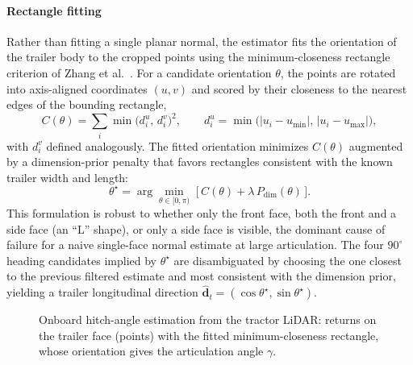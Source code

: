 \paragraph{Rectangle fitting} Rather than fitting a single planar normal, the estimator fits the orientation of the trailer body to the cropped points using the minimum-closeness rectangle criterion of Zhang et al.~\cite{zhang2017lshape}. For a candidate orientation $\theta$, the points are rotated into axis-aligned coordinates $(u, v)$ and scored by their closeness to the nearest edges of the bounding rectangle,
\begin{equation}
    C(\theta) = \sum_i \min\!\big(d^u_i,\, d^v_i\big)^2,
    \qquad
    d^u_i = \min\!\big(|u_i - u_\text{min}|,\, |u_i - u_\text{max}|\big),
    \label{eq:hitch_closeness}
\end{equation}
with $d^v_i$ defined analogously. The fitted orientation minimizes $C(\theta)$ augmented by a dimension-prior penalty that favors rectangles consistent with the known trailer width and length:
\begin{equation}
    \theta^\star = \arg\min_{\theta \in [0, \pi)} \;\big[\, C(\theta) + \lambda\, P_\text{dim}(\theta) \,\big].
    \label{eq:hitch_fit}
\end{equation}
This formulation is robust to whether only the front face, both the front and a side face (an ``L'' shape), or only a side face is visible, the dominant cause of failure for a naive single-face normal estimate at large articulation. The four $90^\circ$ heading candidates implied by $\theta^\star$ are disambiguated by choosing the one closest to the previous filtered estimate and most consistent with the dimension prior, yielding a trailer longitudinal direction $\hat{\mathbf{d}}_t = (\cos\theta^\star, \sin\theta^\star)$.

\begin{figure}[t]
  \centering
  \caption{Onboard hitch-angle estimation from the tractor LiDAR: returns on the trailer face (points) with the fitted minimum-closeness rectangle, whose orientation gives the articulation angle $\gamma$.}
  \label{fig:hitch_fit}
\end{figure}


